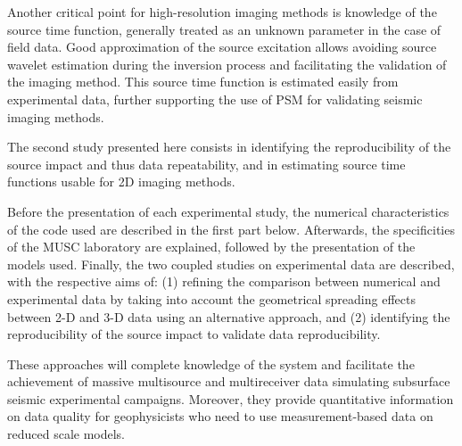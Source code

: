 \documentclass[paper,extra]{gji} %
\newcommand{\twod}{2-D }
\newcommand{\thrd}{3-D }
\begin{document}
\noindent Another critical point for high-resolution imaging methods is knowledge of the source time function, generally treated as an unknown parameter in the case of field data. Good approximation of the source excitation allows avoiding source wavelet estimation during the inversion process and facilitating the validation of the imaging method. This source time function is estimated easily from experimental data, further supporting the use of PSM for validating seismic imaging methods.



\noindent The second study presented here consists in identifying the reproducibility of the source impact and thus data repeatability, and in estimating source time functions usable for 2D imaging methods.



\noindent Before the presentation of each experimental study, the numerical characteristics of the code used are described in the first part below. Afterwards, the specificities of the MUSC laboratory are explained, followed by the presentation of the models used. Finally, the two coupled studies on experimental data are described, with the respective aims of: (1) refining the comparison between numerical and experimental data by taking into account the geometrical spreading effects between \twod and \thrd data using an alternative approach, and (2) identifying the reproducibility of the source impact to validate data reproducibility.

\noindent These approaches will complete knowledge of the system and facilitate the achievement of massive multisource and multireceiver data simulating subsurface seismic experimental campaigns. Moreover, they provide quantitative information on data quality for geophysicists who need to use measurement-based data on reduced scale models. 

\end{document}

